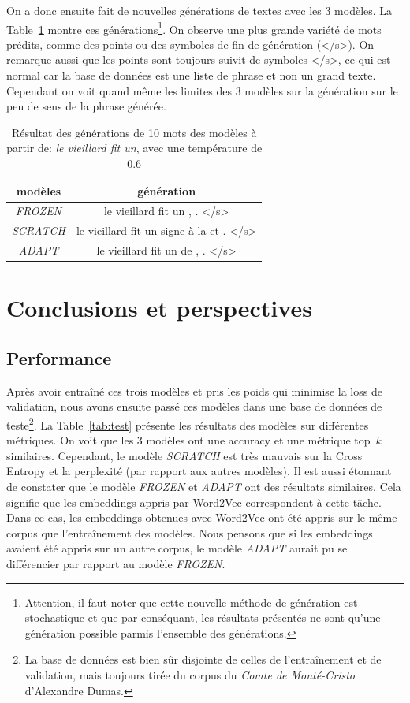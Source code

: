 \documentclass[a4paper]{article}
\begin{document}
On a donc ensuite fait de nouvelles générations de textes avec les 3 modèles. La Table~\ref{tab:generate2}
montre ces générations\footnote{Attention, il faut noter que cette nouvelle méthode de génération est stochastique 
et que par conséquant, les résultats présentés ne sont qu'une génération possible parmis l'ensemble des générations.}. 
On observe une plus grande variété de mots prédits, comme des points ou des symboles de fin de génération (\textless/s\textgreater).
On remarque aussi que les points sont toujours suivit de symboles \textless/s\textgreater, ce qui est normal car la base de données est une liste de 
phrase et non un grand texte. Cependant on voit quand même les limites des 3 modèles sur la génération sur le peu de sens de la phrase générée.


\begin{table}[ht]
  \centering
  \begin{tabular}{|c|c|}
      \hline
      modèles & génération \\
      \hline
      \textit{FROZEN} & le vieillard fit un , . </s>  \\
      \textit{SCRATCH} & le vieillard fit un signe à la et . </s>  \\
      \textit{ADAPT} & le vieillard fit un de , . </s>  \\
      \hline
  \end{tabular}
  \caption{Résultat des générations de 10 mots des modèles à partir de: \textit{le vieillard fit un}, avec une température de 0.6}
  \label{tab:generate2}
\end{table}

\section{Conclusions et perspectives}

\subsection{Performance}

Après avoir entraîné ces trois modèles et pris les poids qui minimise la loss de validation, nous avons ensuite passé ces modèles dans 
une base de données de teste\footnote{La base de données est bien sûr disjointe de celles de l'entraînement et de validation, mais toujours
tirée du corpus du \textit{Comte de Monté-Cristo} d'Alexandre  Dumas.}. La Table~\ref{tab:test} présente les résultats des modèles sur 
différentes métriques. On voit que les 3 modèles ont une accuracy et une métrique top~$k$ similaires. Cependant, le modèle \textit{SCRATCH} 
est très mauvais sur la Cross Entropy et la perplexité (par rapport aux autres modèles). Il est aussi étonnant de constater que le modèle
\textit{FROZEN} et \textit{ADAPT} ont des résultats similaires. Cela signifie que les embeddings appris par Word2Vec correspondent à cette tâche.
Dans ce cas, les embeddings obtenues avec Word2Vec ont été appris sur le même corpus que l'entraînement des modèles. Nous pensons que si 
les embeddings avaient été appris sur un autre corpus, le modèle \textit{ADAPT} aurait  pu se différencier par rapport au modèle \textit{FROZEN}.
\end{document}
